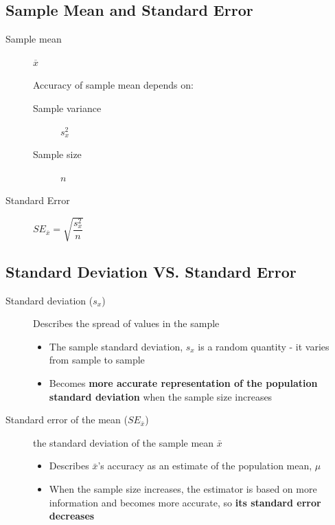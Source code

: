 \documentclass[10pt,article]{article}
\begin{document}
\subsection{Sample Mean and Standard Error}
\label{sec:org02dc014}
\begin{multicols}{2}
\begin{description}
\item[{Sample mean}] \(\overline{x}\)

Accuracy of sample mean depends on:
\begin{description}
\item[{Sample variance}] \(s_x^2\)
\item[{Sample size}] \(n\)
\end{description}
\end{description}

\begin{description}
\item[{Standard Error}] \(SE_{\overline{x}} = \sqrt{\dfrac{s^2_x}{n}}\)
\end{description}

\end{multicols}

\subsection{Standard Deviation VS. Standard Error}
\label{sec:orga9f4e85}
\begin{description}
\item[{Standard deviation (\(s_{x}\))}] Describes the spread of values in the sample 

\begin{itemize}
\item The sample standard deviation, \(s_x\) is a random quantity - it varies from
sample to sample
\item Becomes \textbf{more accurate representation of the population standard
deviation} when the sample size increases
\end{itemize}
\end{description}

\begin{description}
\item[{Standard error of the mean (\(SE_{\bar{x}}\))}] the standard deviation of
the sample mean \(\bar{x}\)

\begin{itemize}
\item Describes \(\bar{x}\)'s accuracy as an estimate of the population mean,
\(\mu\)
\item When the sample size increases, the estimator is based on more information
and becomes more accurate, so \textbf{its standard error decreases}
\end{itemize}
\end{description}
\end{document}
